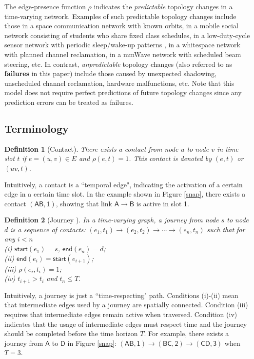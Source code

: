 \documentclass[10pt, conference, letterpaper]{IEEEtran}
\newtheorem{definition}{Definition}
\begin{document}
The edge-presence function $\rho$ indicates the \emph{predictable} topology changes in a time-varying network. Examples of such predictable topology changes include those in a space communication network  with known orbits\cite{space1,space2}, in a mobile social network  consisting of students who
share fixed class schedules\cite{mobile-social}, in a low-duty-cycle sensor network with periodic sleep/wake-up patterns \cite{duty1,duty2}, in a whitespace network with planned channel reclamation\cite{whitespace1,whitespace2}, in a mmWave network  with scheduled beam steering\cite{mmWave}, etc. In contrast, \emph{unpredictable} topology changes (also referred to as \textbf{failures} in this paper) include those caused by unexpected shadowing, unscheduled channel reclamation, hardware malfunctions, etc. Note that this model does not require perfect predictions of future topology changes since any prediction errors can be treated as failures.


\subsection{Terminology}

\begin{definition}[Contact]
There exists a contact from node $u$ to node $v$ in time slot $t$ if $e=(u,v)\in E$ and $\rho(e,t)=1$. This contact is denoted by $(e,t)$ or $(uv, t)$.
\end{definition}

\noindent Intuitively, a contact is a ``temporal edge", indicating the activation of a certain edge in a certain time slot. In the example shown in Figure \ref{snap}, there exists a contact $\mathsf{(AB,1)}$, showing that link $\mathsf{A\rightarrow B}$ is active in slot 1. 

\begin{definition}[{Journey} \cite{TVG1}]
In a time-varying graph, a journey from node $s$ to node $d$ is a sequence of contacts:
$(e_1,t_1)\rightarrow(e_2,t_2)\rightarrow\cdots\rightarrow (e_n,t_n)$ such that for any $i<n$\\
(i) ${\mathsf{start}}(e_1)=s$, $\mathsf{end}(e_n)=d$;\\
(ii)  $\mathsf{end}(e_{i})=\mathsf{start}(e_{i+1})$; \\
(iii) $\rho(e_i,t_i)=1$;\\ (iv) $t_{i+1}> t_i$ and $t_n\le T$. \end{definition}

\noindent Intuitively, a journey is just a ``time-respecting" path. Conditions (i)-(ii) mean that intermediate edges used by a journey are spatially connected. Condition (iii) requires that intermediate edges remain active when traversed. Condition (iv) indicates that the usage of intermediate edges must respect time and the journey should be completed before the time horizon $T$.  For example, there exists a journey from $\mathsf{A}$ to $\mathsf{D}$ in Figure \ref{snap}: $\mathsf{(AB,1)\rightarrow (BC,2)\rightarrow (CD, 3)}$ when $T=3$. 
\end{document}
